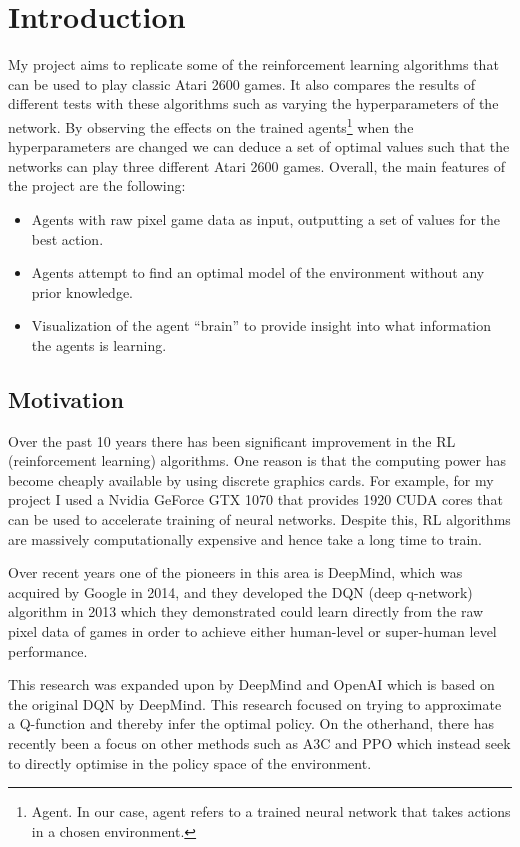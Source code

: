 \chapter{Introduction}
\label{cha:intro}
My project aims to replicate some of the reinforcement learning algorithms that can be used to play classic Atari 2600 games. It also compares the results of different tests with these algorithms such as varying the hyperparameters of the network. By observing the effects on the trained agents\footnote{Agent. In our case, agent refers to a trained neural network that takes actions in a chosen environment.} when the hyperparameters are changed we can deduce a set of optimal values such that the networks can play three different Atari 2600 games. Overall, the main features of the project are the following:
\begin{itemize}
	\item Agents with raw pixel game data as input, outputting a set of values for the best action.
	\item Agents attempt to find an optimal model of the environment without any prior knowledge.
	\item Visualization of the agent ``brain'' to provide insight into what information the agents is learning.
\end{itemize}

\section{Motivation}
\label{intro:sec:moti}
Over the past 10 years there has been significant improvement in the RL (reinforcement learning) algorithms. One reason is that the computing power has become cheaply available by using discrete graphics cards. For example, for my project I used a Nvidia GeForce GTX 1070 that provides 1920 CUDA cores that can be used to accelerate training of neural networks. Despite this, RL algorithms are massively computationally expensive and hence take a long time to train.

Over recent years one of the pioneers in this area is DeepMind, which was acquired by Google in 2014, and they developed the DQN (deep q-network) algorithm in 2013 which they demonstrated could learn directly from the raw pixel data of games in order to achieve either human-level or super-human level performance.

This research was expanded upon by DeepMind and OpenAI which is based on the original DQN by DeepMind. This research focused on trying to approximate a Q-function and thereby infer the optimal policy. On the otherhand, there has recently been a focus on other methods such as A3C and PPO which instead seek to directly optimise in the policy space of the environment.

